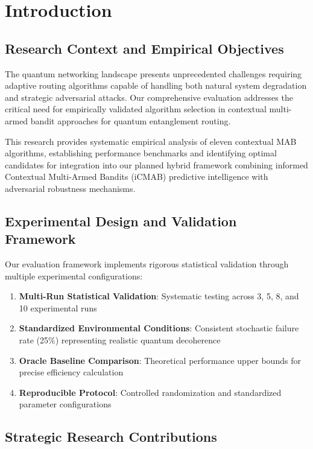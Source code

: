 \documentclass[12pt,a4paper]{article}
\begin{document}
\section{Introduction}

\subsection{Research Context and Empirical Objectives}

The quantum networking landscape presents unprecedented challenges requiring adaptive routing algorithms capable of handling both natural system degradation and strategic adversarial attacks. Our comprehensive evaluation addresses the critical need for empirically validated algorithm selection in contextual multi-armed bandit approaches for quantum entanglement routing.

This research provides systematic empirical analysis of eleven contextual MAB algorithms, establishing performance benchmarks and identifying optimal candidates for integration into our planned hybrid framework combining informed Contextual Multi-Armed Bandits (iCMAB) predictive intelligence with adversarial robustness mechanisms.

\subsection{Experimental Design and Validation Framework}

Our evaluation framework implements rigorous statistical validation through multiple experimental configurations:

\begin{enumerate}
\item \textbf{Multi-Run Statistical Validation}: Systematic testing across 3, 5, 8, and 10 experimental runs
\item \textbf{Standardized Environmental Conditions}: Consistent stochastic failure rate (25\%) representing realistic quantum decoherence
\item \textbf{Oracle Baseline Comparison}: Theoretical performance upper bounds for precise efficiency calculation
\item \textbf{Reproducible Protocol}: Controlled randomization and standardized parameter configurations
\end{enumerate}

\subsection{Strategic Research Contributions}
\end{document}
